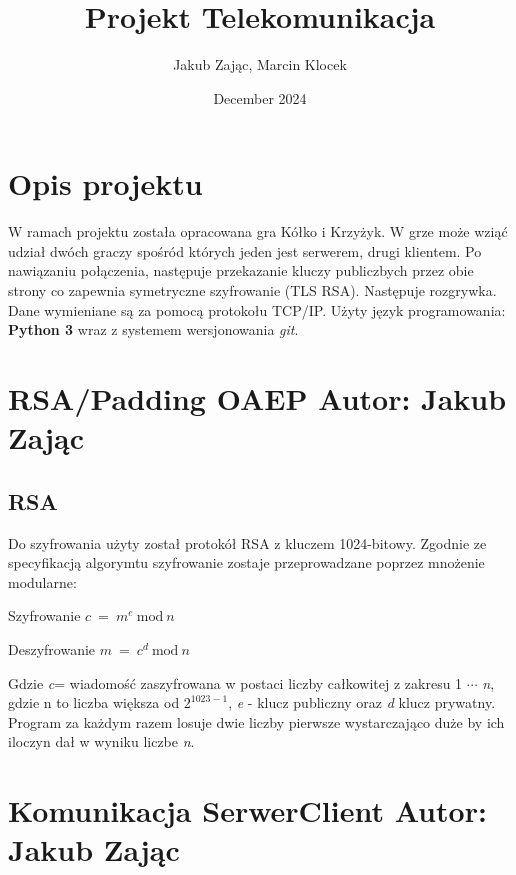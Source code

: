\documentclass[a4paper,12pt]{article}
\title{Projekt Telekomunikacja}
\author{Jakub Zając, Marcin Klocek}
\date{December 2024}
\begin{document}
\maketitle

\section{Opis projektu}
W ramach projektu została opracowana gra Kółko i Krzyżyk. W grze może wziąć udział dwóch graczy spośród których jeden jest serwerem, drugi klientem. Po nawiązaniu połączenia, następuje przekazanie kluczy publiczbych przez obie strony co zapewnia symetryczne szyfrowanie (TLS RSA). Następuje rozgrywka. Dane wymieniane są za pomocą protokołu TCP/IP. Użyty język programowania: \textbf{Python 3} wraz z systemem wersjonowania \textit{git}.

\section{RSA/Padding OAEP \color{red} Autor: Jakub Zając }
\subsection{RSA}
Do szyfrowania użyty został protokół RSA z kluczem 1024-bitowy. Zgodnie ze specyfikacją algorymtu szyfrowanie zostaje przeprowadzane poprzez mnożenie modularne: \newline

\begin{multicols}{2}
\begin{center}
\Large Szyfrowanie \newline
\Large $ c~=~m^e~\mathrm{mod} ~ n$
\end{center}
\vfill

\begin{center}
\Large Deszyfrowanie \newline
\Large $ m~=~c^d~\mathrm{mod} ~ n$
\end{center}
\vfill
\end{multicols}
Gdzie \textit{c}= wiadomość zaszyfrowana w postaci liczby całkowitej z zakresu  1 $\cdots$ \textit{n}, gdzie n to liczba większa od $2^{1023-1}$, \textit{e} - klucz publiczny oraz \textit{d} klucz prywatny. Program za każdym razem losuje dwie liczby pierwsze wystarczająco duże by ich iloczyn dał w wyniku liczbe \textit{n}.



\section{Komunikacja SerwerClient \color{red} Autor: Jakub Zając }
\end{document}
